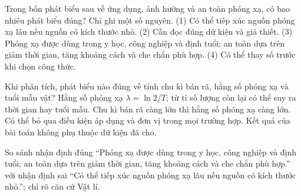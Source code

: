 \begin{ex}
Trong bốn phát biểu sau về ứng dụng, ảnh hưởng và an toàn phóng xạ, có bao nhiêu phát biểu đúng? Chỉ ghi một số nguyên. (1) Có thể tiếp xúc nguồn phóng xạ lâu nếu nguồn có kích thước nhỏ. (2) Cần đọc đúng dữ kiện và giả thiết. (3) Phóng xạ được dùng trong y học, công nghiệp và định tuổi; an toàn dựa trên giảm thời gian, tăng khoảng cách và che chắn phù hợp. (4) Có thể thay số trước khi chọn công thức.
\end{ex}

\begin{ex}
Khi phân tích, phát biểu nào đúng về tính chu kì bán rã, hằng số phóng xạ và tuổi mẫu vật?
\choice
{\True Hằng số phóng xạ $\lambda=\ln2/T$; từ tỉ số lượng còn lại có thể suy ra thời gian hay tuổi mẫu.}
{Chu kì bán rã càng lớn thì hằng số phóng xạ càng lớn.}
{Có thể bỏ qua điều kiện áp dụng và đơn vị trong mọi trường hợp.}
{Kết quả của bài toán không phụ thuộc dữ kiện đã cho.}
\end{ex}

\begin{bt}
So sánh nhận định đúng “Phóng xạ được dùng trong y học, công nghiệp và định tuổi; an toàn dựa trên giảm thời gian, tăng khoảng cách và che chắn phù hợp.” với nhận định sai “Có thể tiếp xúc nguồn phóng xạ lâu nếu nguồn có kích thước nhỏ.”; chỉ rõ căn cứ Vật lí.
\end{bt}

